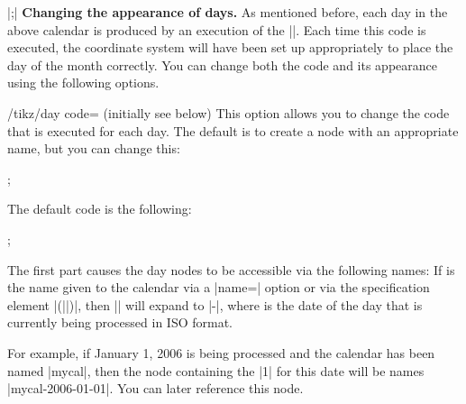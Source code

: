 \begin{command}{\calendar {}|;|}
    \medskip
    \textbf{Changing the appearance of days.}
    As mentioned before, each day in the above calendar is produced by an
    execution of the |\tikzdaycode|. Each time this code is executed, the
    coordinate system will have been set up appropriately to place the day of
    the month correctly. You can change both the code and its appearance using
    the following options.
    \begin{key}{/tikz/day code= (initially \normalfont see below)}
        This option allows you to change the code that is executed for each
        day. The default is to create a node with an appropriate name, but you
        can change this:
\begin{codeexample}[preamble={\usetikzlibrary{calendar}}]
\tikz \calendar[dates=2000-01-01 to 2000-01-31,week list,
                day code={\fill[blue] (0,0) circle [radius=2pt];}];
\end{codeexample}
        The default code is the following:
\begin{codeexample}
\node[name=\pgfcalendarsuggestedname,every day]{\tikzdaytext};
\end{codeexample}
        The first part causes the day nodes to be accessible via the following
        names: If  is the name given to the calendar via a |name=|
        option or via the specification element |(||)|, then
        |\pgfcalendarsuggestedname| will expand to |-|,
        where  is the date of the day that is currently being
        processed in ISO format.

        For example, if January 1, 2006 is being processed and the calendar has
        been named |mycal|, then the node containing the |1| for this date will
        be names |mycal-2006-01-01|. You can later reference this node.
\begin{codeexample}[preamble={\usetikzlibrary{calendar}}]
\end{codeexample}
    \end{key}


\end{command}
